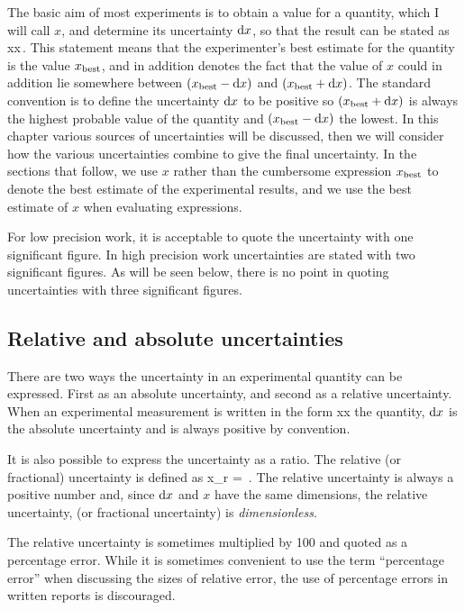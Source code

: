 The basic aim of most experiments is to obtain a value for a quantity, which I will call $x$, and determine its uncertainty $\text{d} x$, so that the result can be stated as
\beq
x\pm\dx x\,.
\eeq
This statement means that the experimenter's best estimate for the quantity is the value $x_\text{best}$, and in addition denotes the fact that the value of $x$ could in addition lie somewhere between $(x_\text{best} - \text{d} x)$ and $(x_\text{best} + \text{d} x)$. The standard convention is to define the uncertainty $\text{d} x$ to be positive so $(x_\text{best} + \text{d} x)$ is always the highest probable value of the quantity and $(x_\text{best} - \text{d} x)$ the lowest. In this chapter various sources of uncertainties will be discussed, then we will consider how the various uncertainties combine to give the final uncertainty. In the sections that follow, we use $x$ rather than the cumbersome expression $x_\text{best}$ to denote the best estimate of the experimental results, and we use the best estimate of $x$ when evaluating expressions.

For low precision work, it is acceptable to quote the uncertainty with one significant figure. In high precision work uncertainties are stated with two significant figures. As will be seen below, there is no point in quoting uncertainties with three significant figures.


\subsection{Relative and absolute uncertainties}
There are two ways the uncertainty in an experimental quantity can be expressed. First as an absolute uncertainty, and second as a relative uncertainty. When an experimental measurement is written in the form
\beq
x\pm\dx x
\eeq
the quantity, $\text{d} x$ is the absolute uncertainty and is always positive by convention.

It is also possible to express the uncertainty as a ratio. The relative (or fractional) uncertainty is defined as
\beq
\dx x_r = \,.
\eeq
The relative uncertainty is always a positive number and, since $\text{d} x$ and $x$ have the same dimensions, the relative uncertainty, (or fractional uncertainty) is \emph{dimensionless}.

The relative uncertainty is sometimes multiplied by 100 and quoted as a percentage error. While it is sometimes convenient to use the term ``percentage error'' when discussing the sizes of relative error, the use of percentage errors in written reports is discouraged.

